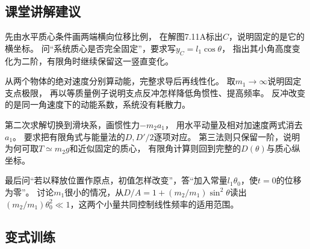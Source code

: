 \documentclass[UTF8,fontset=fandol,a4paper,11pt]{ctexart}
\begin{document}


\subsection*{课堂讲解建议}

先由水平质心条件画两端横向位移比例，
在解图7.11A标出$C$，说明固定的是它的横坐标。
问“系统质心是否完全固定”，要求写$y_C=l_1\cos\theta$，
指出其小角高度变化为二阶，有限角时继续保留这一竖直变化。

从两个物体的绝对速度分别算动能，完整求导后再线性化。
取$m_1\to\infty$说明固定支点极限，
再以等质量例子说明支点反冲怎样降低角惯性、提高频率。
反冲改变的是同一角速度下的动能系数，系统没有耗散力。

第二次求解切换到滑块系，画惯性力$-m_2a_1$，
用水平动量及相对加速度两式消去$a_1$。
要求把有限角式与能量法的$D,D'/2$逐项对应。
第三法则只保留一阶，说明为何可取$T\simeq m_2g$和近似固定的质心，
有限角计算则回到完整的$D(\theta)$与质心纵坐标。

最后问“若以释放位置作原点，初值怎样改变”，答“加入常量$l_1\theta_0$，使$t=0$的位移为零”。
讨论$m_1$很小的情况，从$D/A=1+(m_2/m_1)\sin^2\theta$读出
$(m_2/m_1)\theta_0^2\ll1$，这两个小量共同控制线性频率的适用范围。




\subsection*{变式训练}
\end{document}
